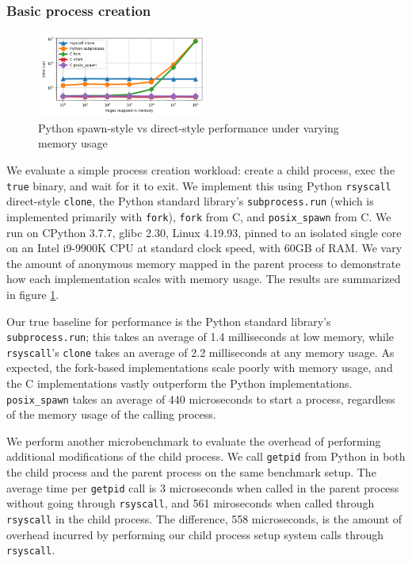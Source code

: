 \documentclass[letterpaper,twocolumn,10pt]{article}
\begin{document}
\subsubsection{Basic process creation}
\begin{figure}[h!]
\centering
 \includegraphics[width=0.5\textwidth]{subprocess_bench}
 \caption{Python spawn-style vs direct-style performance under varying memory usage}
 \label{fig:subprocess_bench}
\end{figure}
We evaluate a simple process creation workload:
create a child process, exec the \texttt{true} binary, and wait for it to exit.
We implement this using Python \texttt{rsyscall} direct-style \texttt{clone},
the Python standard library's \texttt{subprocess.run} (which is implemented primarily with \texttt{fork}),
\texttt{fork} from C,
and \texttt{posix\_spawn} from C.
We run on CPython 3.7.7, glibc 2.30, Linux 4.19.93,
pinned to an isolated single core on an Intel i9-9900K CPU at standard clock speed,
with 60GB of RAM.
We vary the amount of anonymous memory mapped in the parent process
to demonstrate how each implementation scales with memory usage.
The results are summarized in figure \ref{fig:subprocess_bench}.

Our true baseline for performance is the Python standard library's \texttt{subprocess.run};
this takes an average of 1.4 milliseconds at low memory,
while \texttt{rsyscall}'s \texttt{clone} takes an average of 2.2 milliseconds at any memory usage.
As expected, the fork-based implementations scale poorly with memory usage,
and the C implementations vastly outperform the Python implementations.
\texttt{posix\_spawn} takes an average of 440 microseconds to start a process,
regardless of the memory usage of the calling process.

We perform another microbenchmark to evaluate the overhead of performing additional modifications of the child process.
We call \texttt{getpid} from Python
in both the child process and the parent process on the same benchmark setup.
The average time per \texttt{getpid} call is
3 microseconds when called in the parent process without going through \texttt{rsyscall},
and 561 miroseconds when called through \texttt{rsyscall} in the child process.
The difference, 558 microseconds,
is the amount of overhead incurred
by performing our child process setup system calls through \texttt{rsyscall}.
\end{document}
